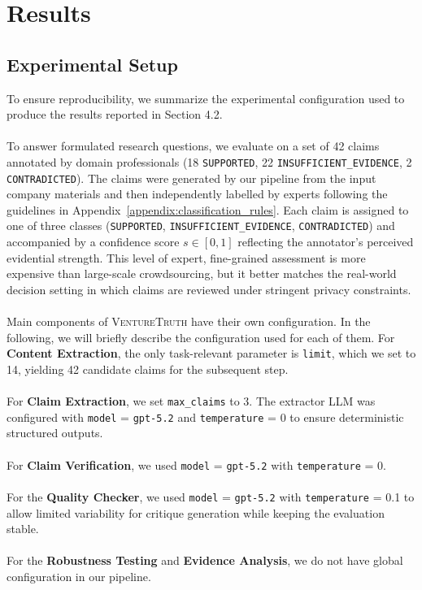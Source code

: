 \section{Results}

\subsection{Experimental Setup}
To ensure reproducibility, we summarize the experimental configuration used to produce the results reported in Section 4.2.
\\
\\
To answer formulated research questions, we evaluate on a set of 42 claims annotated by domain professionals (18 \texttt{SUPPORTED}, 22 \texttt{INSUFFICIENT\_EVIDENCE}, 2 \texttt{CONTRADICTED}). The claims were generated by our pipeline from the input company materials and then independently labelled by experts following the guidelines in Appendix~\ref{appendix:classification_rules}. Each claim is assigned to one of three classes (\texttt{SUPPORTED}, \texttt{INSUFFICIENT\_EVIDENCE}, \texttt{CONTRADICTED}) and accompanied by a confidence score $s \in [0,1]$ reflecting the annotator's perceived evidential strength. This level of expert, fine-grained assessment is more expensive than large-scale crowdsourcing, but it better matches the real-world decision setting in which claims are reviewed under stringent privacy constraints.
\\
\\
Main components of \textsc{VentureTruth} have their own configuration. In the following, we will briefly describe the configuration used for each of them. For \textbf{Content Extraction}, the only task-relevant parameter is \texttt{limit}, which we set to 14, yielding 42 candidate claims for the subsequent step.
\\
\\
For \textbf{Claim Extraction}, we set \texttt{max\_claims} to 3. The extractor LLM was configured with \texttt{model} = \texttt{gpt-5.2} and \texttt{temperature} = 0 to ensure deterministic structured outputs.
\\
\\
For \textbf{Claim Verification}, we used \texttt{model} = \texttt{gpt-5.2} with \texttt{temperature} = 0.
\\
\\
For the \textbf{Quality Checker}, we used \texttt{model} = \texttt{gpt-5.2} with \texttt{temperature} = 0.1 to allow limited variability for critique generation while keeping the evaluation stable.
\\
\\
For the \textbf{Robustness Testing} and \textbf{Evidence Analysis}, we do not have global configuration in our pipeline.

